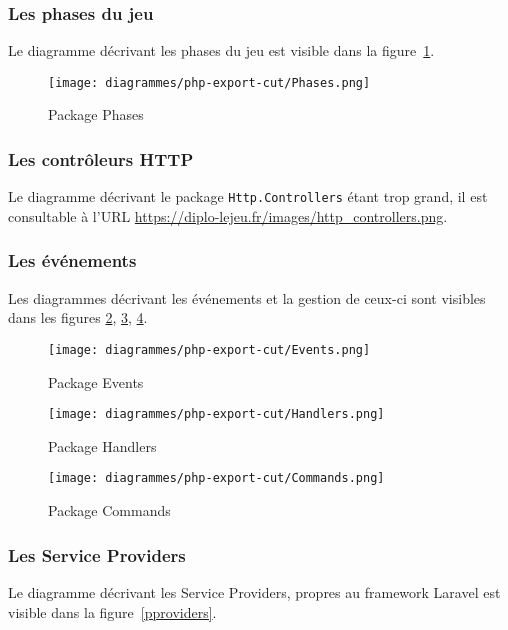         \subsubsection{Les phases du jeu}
        Le diagramme décrivant les phases du jeu est visible dans la figure~\ref{pphases}.

			\begin{figure}[H]
				\centering
                \texttt{[image: diagrammes/php-export-cut/Phases.png]}
                \caption{\label{pphases}Package Phases}
			\end{figure}

        \subsubsection{Les contrôleurs HTTP}
        Le diagramme décrivant le package \verb|Http.Controllers| étant trop grand, il est consultable à l'URL \url{https://diplo-lejeu.fr/images/http\_controllers.png}.

        \subsubsection{Les événements}
        Les diagrammes décrivant les événements et la gestion de ceux-ci sont visibles dans les figures \ref{pevents}, \ref{phandlers}, \ref{pcommands}.

        	\begin{figure}[H]
				\centering
                \texttt{[image: diagrammes/php-export-cut/Events.png]}
                \caption{\label{pevents}Package Events}
			\end{figure}

			\begin{figure}[H]
				\centering
                \texttt{[image: diagrammes/php-export-cut/Handlers.png]}
                \caption{\label{phandlers}Package Handlers}
			\end{figure}

			\begin{figure}[H]
				\centering
                \texttt{[image: diagrammes/php-export-cut/Commands.png]}
                \caption{\label{pcommands}Package Commands}
			\end{figure}

        \subsubsection{Les Service Providers}
        Le diagramme décrivant les Service Providers, propres au framework Laravel est visible dans la figure~\ref{pproviders}.

